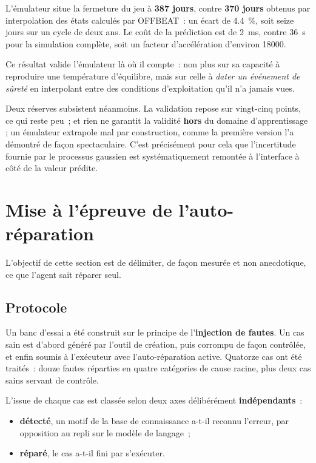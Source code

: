 \documentclass[12pt,a4paper,french]{report}
\begin{document}
L'émulateur situe la fermeture du jeu à \textbf{\num{387} jours}, contre
\textbf{\num{370} jours} obtenus par interpolation des états calculés par
OFFBEAT~: un écart de \SI{4.4}{\percent}, soit seize jours sur un cycle de
deux ans. Le coût de la prédiction est de \SI{2}{\milli\second}, contre
\SI{36}{\second} pour la simulation complète, soit un facteur d'accélération
d'environ \num{18000}.

Ce résultat valide l'émulateur là où il compte~: non plus sur sa capacité à
reproduire une température d'équilibre, mais sur celle à \emph{dater un
événement de sûreté} en interpolant entre des conditions d'exploitation qu'il
n'a jamais vues.

Deux réserves subsistent néanmoins. La validation repose sur vingt-cinq points,
ce qui reste peu~; et rien ne garantit la validité \textbf{hors} du domaine
d'apprentissage ; un émulateur extrapole mal par construction, comme la
première version l'a démontré de façon spectaculaire. C'est précisément pour
cela que l'incertitude fournie par le processus gaussien est systématiquement
remontée à l'interface à côté de la valeur prédite.

\section{Mise à l'épreuve de l'auto-réparation}
\label{sec:epreuve}

L'objectif de cette section est de délimiter, de façon mesurée et non
anecdotique, ce que l'agent sait réparer seul.

\subsection{Protocole}

Un banc d'essai a été construit sur le principe de l'\textbf{injection de
fautes}. Un cas sain est d'abord généré par l'outil de création, puis corrompu
de façon contrôlée, et enfin soumis à l'exécuteur avec l'auto-réparation
active. Quatorze cas ont été traités~: douze fautes réparties en quatre
catégories de cause racine, plus deux cas sains servant de contrôle.

L'issue de chaque cas est classée selon deux axes délibérément
\textbf{indépendants}~:
\begin{itemize}
  \item \textbf{détecté}, un motif de la base de connaissance a-t-il reconnu
    l'erreur, par opposition au repli sur le modèle de langage~;
  \item \textbf{réparé}, le cas a-t-il fini par s'exécuter.
\end{itemize}
\end{document}
